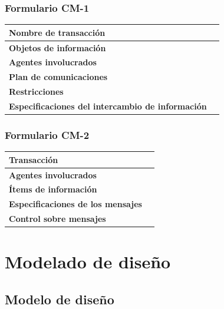 \documentclass[a4paper,11pt]{article}
\begin{document}
			\subsubsection{Formulario CM-1}
			\begin{center}
				\begin{tabular}{| l | l |}
					\hline
					\textbf{Nombre de transacción} & \\
					\hline
					\textbf{Objetos de información} & \\
					\hline
					\textbf{Agentes involucrados} & \\
					\hline
					\textbf{Plan de comunicaciones} & \\
					\hline
					\textbf{Restricciones} & \\
					\hline
					\textbf{Especificaciones del intercambio de información} & \\
					\hline
				\end{tabular}
			\end{center}
			\subsubsection{Formulario CM-2}
			\begin{center}
				\begin{tabular}{| l | l |}
					\hline
					\textbf{Transacción} & \\
					\hline
					\textbf{Agentes involucrados} & \\
					\hline
					\textbf{Ítems de información} & \\
					\hline
					\textbf{Especificaciones de los mensajes} & \\
					\hline
					\textbf{Control sobre mensajes} & \\
					\hline
				\end{tabular}
			\end{center}
	\newpage
	\section{Modelado de diseño}
		\subsection{Modelo de diseño}
\end{document}
